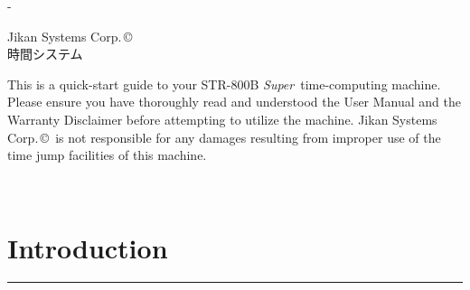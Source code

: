 \documentclass[a5paper,onecolumn,final,10pt]{memoir}
\newcommand\machinename%
	{\textsf{STR-800B \textit{Super}}}
\newcommand\companyname%
	{Jikan Systems Corp.\,\copyright}
\begin{document}
\frontmatter

\begin{titlingpage}
\calccentering{\unitlength}
\begin{adjustwidth*}{\unitlength}{-\unitlength}
	\centering
	
	\vspace*{4\baselineskip}
	
	
	\vfill
	
	{\footnotesize \companyname \\ 時間システム}
\end{adjustwidth*}
\end{titlingpage}



\thispagestyle{empty}

\begin{footnotesize}
\noindent
This is a quick-start guide to your \machinename\ time-computing machine. 
Please ensure you have thoroughly read and understood the User Manual and the Warranty Disclaimer before attempting to utilize the machine. 
\companyname\ is not responsible for any damages resulting from improper use of the time jump facilities of this machine. 

~

\end{footnotesize}



\clearpage
\renewcommand\cftchapterfont{\ttfamily}
\renewcommand\cftchapterleader{\ttfamily\cftdotfill{.}}  %
\renewcommand\cftchapterpagefont{\ttfamily}
\tableofcontents*



\mainmatter

\section{Introduction}
\vspace*{-20pt}\rule{\textwidth}{0.8pt}
\end{document}
